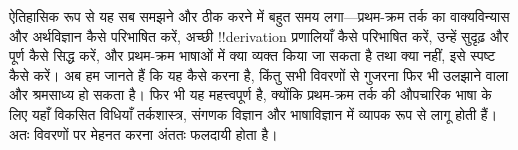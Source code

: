 \documentclass[../../../include/open-logic-section]{subfiles}
\begin{document}
ऐतिहासिक रूप से यह सब समझने और ठीक करने में बहुत समय लगा---प्रथम-क्रम तर्क
का वाक्यविन्यास और अर्थविज्ञान कैसे परिभाषित करें, अच्छी !!{derivation}
प्रणालियाँ कैसे परिभाषित करें, उन्हें सुदृढ़ और पूर्ण कैसे सिद्ध करें, और
प्रथम-क्रम भाषाओं में क्या व्यक्त किया जा सकता है तथा क्या नहीं, इसे स्पष्ट
कैसे करें। अब हम जानते हैं कि यह कैसे करना है, किंतु सभी विवरणों से गुजरना
फिर भी उलझाने वाला और श्रमसाध्य हो सकता है। फिर भी यह महत्त्वपूर्ण है, क्योंकि
प्रथम-क्रम तर्क की औपचारिक भाषा के लिए यहाँ विकसित विधियाँ तर्कशास्त्र,
संगणक विज्ञान और भाषाविज्ञान में व्यापक रूप से लागू होती हैं। अतः विवरणों पर
मेहनत करना अंततः फलदायी होता है।
\end{document}
